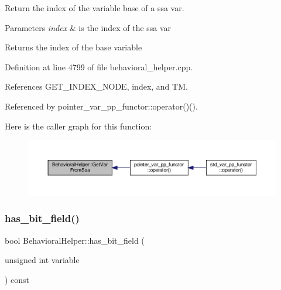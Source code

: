 Return the index of the variable base of a ssa var. 


\begin{DoxyParams}{Parameters}
{\em index} & is the index of the ssa var \\
\hline
\end{DoxyParams}
\begin{DoxyReturn}{Returns}
the index of the base variable 
\end{DoxyReturn}


Definition at line 4799 of file behavioral\+\_\+helper.\+cpp.



References G\+E\+T\+\_\+\+I\+N\+D\+E\+X\+\_\+\+N\+O\+DE, index, and TM.



Referenced by pointer\+\_\+var\+\_\+pp\+\_\+functor\+::operator()().

Here is the caller graph for this function\+:
\nopagebreak
\begin{figure}[H]
\begin{center}
\leavevmode
\includegraphics[width=350pt]{dd/db2/classBehavioralHelper_aee0f46734f9ca668346fbf515f1aa009_icgraph}
\end{center}
\end{figure}
\mbox{\label{classBehavioralHelper_a60077771dc29e3fddbbcfe9330b38030}} 
\subsubsection{\texorpdfstring{has\+\_\+bit\+\_\+field()}{has\_bit\_field()}}
{\footnotesize\ttfamily bool Behavioral\+Helper\+::has\+\_\+bit\+\_\+field (\begin{DoxyParamCaption}\item[{unsigned int}]{variable }\end{DoxyParamCaption}) const\hspace{0.3cm}{\ttfamily [protected]}}



